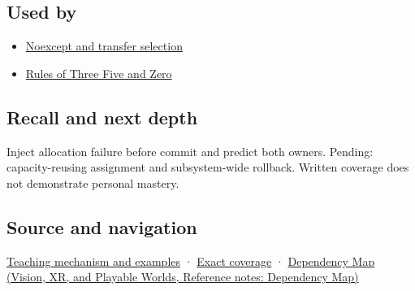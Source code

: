 \subsection{Used by}\label{appendix-bea6beb5350f-used-by}

\hypertarget{appendix-bea6beb5350f-used-by}{}

\begin{itemize}
\tightlist
\item
  \hyperref[appendix-c746afaa47d1]{Noexcept and transfer selection}
\item
  \hyperref[appendix-7679107d057e]{Rules of Three Five and Zero}
\end{itemize}

\subsection{Recall and next depth}\label{appendix-bea6beb5350f-recall-and-next-depth}

\hypertarget{appendix-bea6beb5350f-recall-and-next-depth}{}

Inject allocation failure before commit and predict both owners. Pending: capacity-reusing assignment and subsystem-wide rollback. Written coverage does not demonstrate personal mastery.

\subsection{Source and navigation}\label{appendix-bea6beb5350f-source-and-navigation}

\hypertarget{appendix-bea6beb5350f-source-and-navigation}{}

\hyperref[01-foundations-i-ch003-replacing-a-value-is-not-creating-an-object]{Teaching mechanism and examples} · \hyperref[appendix-fd090d982a15-m009---parts-127-147]{Exact coverage} · \href{../07-Vision-XR-and-Playable-Worlds/main.pdf\#nameddest=appendix-4ad47bdd269a}{Dependency Map (Vision, XR, and Playable Worlds, Reference notes: Dependency Map)}
